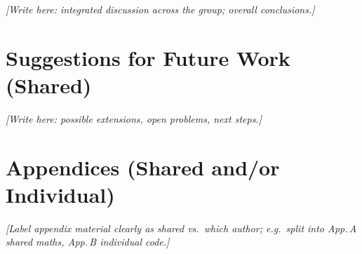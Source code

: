 \documentclass[11pt,a4paper,oneside]{report}
\begin{document}
\textit{[Write here: integrated discussion across the group; overall conclusions.]}

\chapter{Suggestions for Future Work (Shared)}
\label{ch:future}

\textit{[Write here: possible extensions, open problems, next steps.]}

\printbibliography[heading=bibintoc,title={References (IEEE)}]

\appendix

\chapter{Appendices (Shared and/or Individual)}
\label{app:main}

\textit{[Label appendix material clearly as shared vs.\ which author; e.g.\ split into App.\,A shared maths, App.\,B individual code.]}
\end{document}
